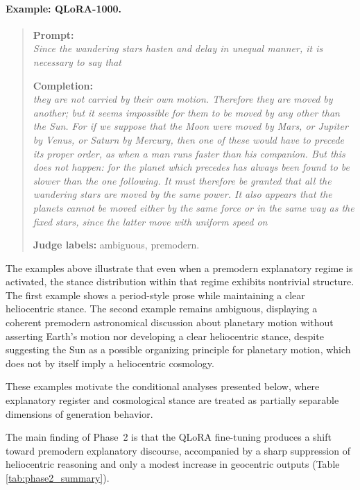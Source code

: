 \paragraph{Example: QLoRA-1000.}
\begin{quote}
\textbf{Prompt:} \\
\textit{Since the wandering stars hasten and delay in unequal manner, it is necessary to say that}

\vspace{0.5em}

\textbf{Completion:} \\
\textit{they are not carried by their own motion. Therefore they are moved by another; but it seems impossible for them to be moved by any other than the Sun. For if we suppose that the Moon were moved by Mars, or Jupiter by Venus, or Saturn by Mercury, then one of these would have to precede its proper order, as when a man runs faster than his companion. But this does not happen: for the planet which precedes has always been found to be slower than the one following. It must therefore be granted that all the wandering stars are moved by the same power. It also appears that the planets cannot be moved either by the same force or in the same way as the fixed stars, since the latter move with uniform speed on}
\vspace{0.5em}

\textbf{Judge labels:} ambiguous, premodern.
\end{quote}

The examples above illustrate that even when a premodern explanatory regime is activated, the stance distribution within that regime exhibits nontrivial structure. The first example shows a period-style prose while maintaining a clear heliocentric stance. The second example remains ambiguous, displaying a coherent premodern astronomical discussion about planetary motion without asserting Earth's motion nor developing a clear heliocentric stance, despite suggesting the Sun as a possible organizing principle for planetary motion, which does not by itself imply a heliocentric cosmology.

These examples motivate the conditional analyses presented below, where explanatory register and cosmological stance are treated as partially separable dimensions of generation behavior.

The main finding of Phase~2 is that the QLoRA fine-tuning produces a shift toward premodern explanatory discourse, accompanied by a sharp suppression of heliocentric reasoning and only a modest increase in geocentric outputs (Table \ref{tab:phase2_summary}).

